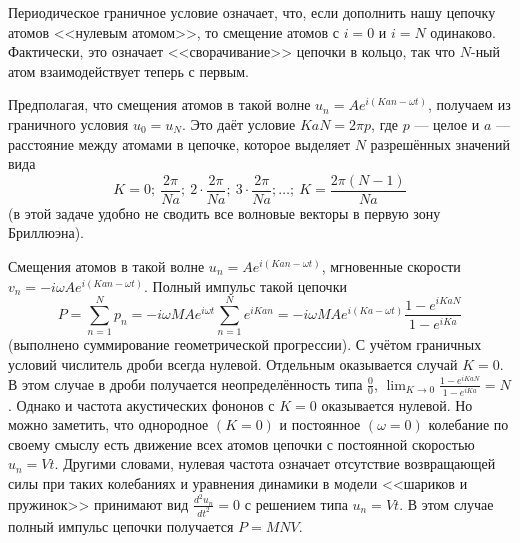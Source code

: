 \documentclass[a4paper]{article}
\begin{document}
\begin{hiProb}[2.16]
\end{hiProb}
\begin{sol}
Периодическое граничное условие означает, что, если дополнить нашу
цепочку атомов <<нулевым атомом>>, то смещение атомов с $i=0$ и 
$i=N$ одинаково. Фактически, это означает <<сворачивание>> цепочки в кольцо,
так что $N$-ный атом взаимодействует теперь с первым.

Предполагая, что смещения атомов в такой волне $u_n=A e^{i\left( K
an-\omega t\right) }$, получаем из граничного условия $u_0=u_N$.
Это даёт условие $KaN=2\pi p$, где $p$ --- целое и $a$ --- расстояние
между атомами в цепочке, которое выделяет $N$ разрешённых
значений вида 
 \[
K=0;\ \frac{2\pi}{Na};\ 2\cdot\frac{2\pi}{Na};\
3\cdot\frac{2\pi}{Na};\ldots;\ K=\frac{2\pi (N-1)}{Na}
\]
(в этой задаче удобно не сводить все волновые векторы в первую
зону Бриллюэна).

Смещения атомов в такой волне $u_n=A e^{i\left( Kan-\omega t \right) }$, мгновенные скорости $v_n=-i\omega A e^{i\left( Kan-\omega t \right) }$. Полный импульс такой цепочки
\[
	P= \sum_{n=1}^{N} p_n= -i\omega MA e^{i\omega t} \sum_{n=1}^{N} e^{iKan}= -i\omega MA e^{i\left( Ka-\omega t \right) }
	\frac{1-e^{iKaN}}{1-e^{iKa}}
\] 
(выполнено суммирование геометрической прогрессии).
С учётом граничных условий числитель дроби всегда нулевой.
Отдельным оказывается случай $K=0$. В этом случае в дроби
получается неопределённость типа $\frac{0}{0}$, $\lim_{K \to 0} 
\frac{1-e^{iKaN}}{1-e^{iKa}}=N$. Однако и частота акустических
фононов с $K=0$ оказывается нулевой. Но можно заметить,
что однородное $(K=0)$ и постоянное $(\omega=0)$ колебание
по своему смыслу есть движение всех атомов цепочки с постоянной
скоростью $u_n=Vt$. Другими словами, нулевая частота означает
отсутствие возвращающей силы при таких колебаниях и уравнения
динамики в модели <<шариков и пружинок>> принимают вид
$\frac{d^2u_n}{dt^2}=0$ с решением типа $u_n=Vt$. В этом
случае полный импульс цепочки получается $P=MNV$.
\end{sol}
\end{document}
